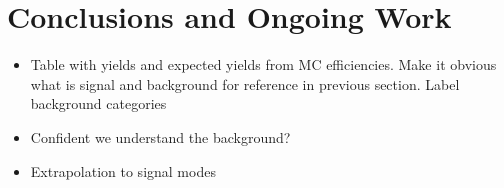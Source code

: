 \documentclass[oneside,12pt]{article}
\begin{document}
\section{Conclusions and Ongoing Work} \label{conclusion}
\begin{itemize}
\item Table with yields and expected yields from MC efficiencies. Make it
obvious what is signal and background for reference in previous section. Label
background categories
\item Confident we understand the background?
\item Extrapolation to signal modes
\end{itemize}

\printbibliography[heading=bibintoc,{title=References}]
\end{document}

